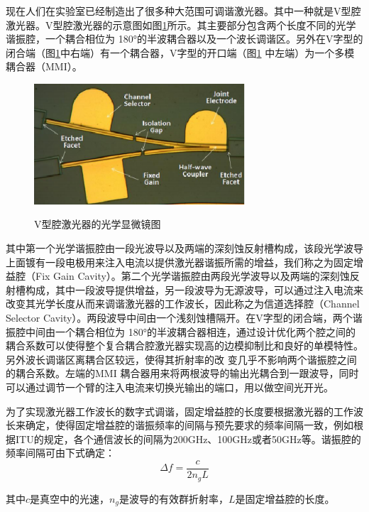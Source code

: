 \documentclass{ZJUthesis}
\begin{document}
现在人们在实验室已经制造出了很多种大范围可调谐激光器。其中一种就是V型腔激光器。V型腔激光器的示意图如图\ref{fig_vccl}所示。其主要部分包含两个长度不同的光学谐振腔，一个耦合相位为 180°的半波耦合器以及一个波长调谐区。另外在V字型的闭合端（图\ref{fig_vccl}中右端）有一个耦合器，V字型的开口端（图\ref{fig_vccl} 中左端）为一个多模耦合器（MMI）。

\begin{figure}[!htb]
  \centering
  \includegraphics[width=0.7\textwidth]{./Pictures/vccl.eps}\\
  \caption{V型腔激光器的光学显微镜图\cite{jin201116-VCCL}}
  \label{fig_vccl}
\end{figure}

其中第一个光学谐振腔由一段光波导以及两端的深刻蚀反射槽构成，该段光学波导上面镀有一段电极用来注入电流以提供激光器谐振所需的增益，我们称之为固定增益腔（Fix Gain Cavity）。第二个光学谐振腔由两段光学波导以及两端的深刻蚀反射槽构成，其中一段波导提供增益，另一段波导为无源波导，可以通过注入电流来改变其光学长度从而来调谐激光器的工作波长，因此称之为信道选择腔（Channel Selector Cavity）。两段波导中间由一个浅刻蚀槽隔开。在V字型的闭合端，两个谐振腔中间由一个耦合相位为 180°的半波耦合器相连，通过设计优化两个腔之间的耦合系数可以使得整个复合耦合腔激光器实现高的边模抑制比和良好的单模特性。另外波长调谐区离耦合区较远，使得其折射率的改
变几乎不影响两个谐振腔之间的耦合系数。左端的MMI 耦合器用来将两根波导的输出光耦合到一跟波导，同时可以通过调节一个臂的注入电流来切换光输出的端口，用以做空间光开光。

为了实现激光器工作波长的数字式调谐，固定增益腔的长度要根据激光器的工作波长来确定，使得固定增益腔的谐振频率的间隔与预先要求的频率间隔一致，例如根据ITU的规定，各个通信波长的间隔为200GHz、100GHz或者50GHz等。谐振腔的频率间隔可由下式确定：
\begin{equation}
  \Delta f = \frac{c}{2 n_g L}
\end{equation}

其中$c$是真空中的光速，$n_g$是波导的有效群折射率，$L$是固定增益腔的长度。
\end{document}

